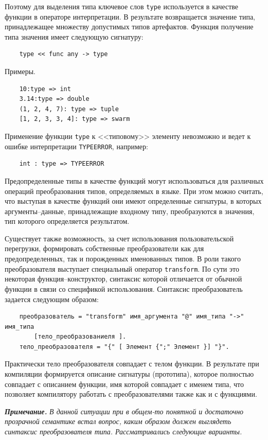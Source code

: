 Поэтому для выделения типа ключевое слов \verb|type| используется в качестве функции в операторе интерпретации. В результате возвращается значение типа, принадлежащее множеству допустимых типов артефактов. Функция получение типа значения имеет следующую сигнатуру:
\begin{verbatim}
    type << func any -> type
\end{verbatim}

Примеры.
\begin{verbatim}
    10:type => int
    3.14:type => double
    (1, 2, 4, 7): type => tuple
    [1, 2, 3, 3, 4]: type => swarm
\end{verbatim}

Применение функции \verb|type| к <<типовому>> элементу невозможно и ведет к ошибке интерпретации \verb|TYPEERROR|, например:
\begin{verbatim}
    int : type => TYPEERROR
\end{verbatim}

Предопределенные типы в качестве функций могут использоваться для различных операций преобразования типов, определяемых в языке. При этом можно считать, что выступая в качестве функций они имеют определенные сигнатуры, в которых аргументы--данные, принадлежащие входному типу, преобразуются в значения, тип которого определяется результатом.

Существует также возможность, за счет использования пользовательской перегрузки, формировать собственные преобразователи как для предопределенных, так и порожденных именованных типов. В роли такого преобразователя выступает специальный оператор \verb|transform|. По сути это некоторая функция--конструктор, синтаксис которой отличается от обычной функции в связи со спецификой использования. Синтаксис преобразователь задается следующим образом:
\begin{verbatim}
    преобразователь = "transform" имя_аргумента "@" имя_типа "->" имя_типа
        [тело_преобразованиеля ].
    тело_преобразователя = "{" [ Элемент {";" Элемент }] "}".
\end{verbatim}
Практически тело преобразователя совпадает с телом функции. В результате при компиляции формируется описание сигнатуры (прототипа), которое полностью совпадает с описанием функции, имя которой совпадает с именем типа, что позволяет компилятору работать с преобразователями также как и с функциями.

\textit{\textbf{Примечание.}}
\textit{В данной ситуации при в общем-то понятной и достаточно прозрачной семантике встал вопрос, каким образом должен выглядеть синтаксис преобразователя типа. Рассматривались следующие варианты.}

